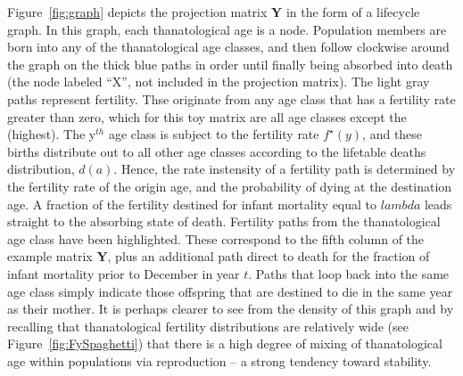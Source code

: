 \documentclass{article}
\begin{document}
Figure~\ref{fig:graph} depicts the projection matrix $\textbf{Y}$ in the form of
a lifecycle graph. In this graph, each thanatological age is a node. Population
members are born into any of the thanatological age classes, and then follow
clockwise around the graph on the thick blue paths in order until finally being
absorbed into death (the node labeled ``X'', not included in the projection matrix). The light gray paths represent fertility. Thse originate from any age class that has a fertility rate greater
than zero, which for this toy matrix are all age classes except the 
(highest). The y$^{th}$ age class is subject to the fertility rate $f^\star
(y)$, and these births distribute out to all other age classes according to the
lifetable deaths distribution, $d(a)$. Hence, the rate instensity of a fertility
path is determined by the fertility rate of the origin age, and the probability of dying at the destination age. A fraction of the fertility destined for infant mortality equal
to $lambda$ leads straight to the absorbing state of death. Fertility paths from
the  thanatological age class have been highlighted. These correspond
to the fifth column of the example matrix $\textbf{Y}$, plus an additional path
direct to death for the fraction of infant mortality prior to December 
in year $t$. Paths that loop back into the same age class simply indicate those
offspring that are destined to die in the same year as their mother. It is
perhaps clearer to see from the density of this graph and by recalling that
thanatological fertility distributions are relatively wide (see
Figure~\ref{fig:FySpaghetti}) that there is a high degree of mixing of
thanatological age within populations via reproduction -- a strong tendency
toward stability.
\end{document}
